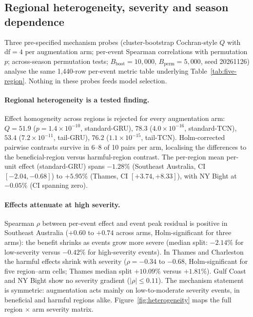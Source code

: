 \subsection{Regional heterogeneity, severity and season dependence}
\label{sec:results-heterogeneity}

Three pre-specified mechanism probes (cluster-bootstrap Cochran-style $Q$
with $\text{df}=4$ per augmentation arm; per-event Spearman correlations
with permutation $p$; across-season permutation tests; $B_{\text{boot}} =
10{,}000$, $B_{\text{perm}} = 5{,}000$, seed 20261126) analyse the same
1{,}440-row per-event metric table underlying
Table~\ref{tab:five-region}. Nothing in these probes feeds model selection.

\paragraph{Regional heterogeneity is a tested finding.} Effect homogeneity
across regions is rejected for every augmentation arm: $Q = 51.9$
($p = 1.4\times10^{-10}$, standard-GRU), $78.3$ ($4.0\times10^{-16}$,
standard-TCN), $53.4$ ($7.2\times10^{-11}$, tail-GRU), $76.2$
($1.1\times10^{-15}$, tail-TCN). Holm-corrected pairwise contrasts survive
in 6--8 of 10 pairs per arm, localising the differences to the
beneficial-region versus harmful-region contrast. The per-region mean
per-unit effect (standard-GRU) spans $-1.28\%$ (Southeast Australia, CI
$[-2.04,-0.68]$) to $+5.95\%$ (Thames, CI $[+3.74,+8.33]$), with NY Bight
at $-0.05\%$ (CI spanning zero).

\paragraph{Effects attenuate at high severity.} Spearman $\rho$ between
per-event effect and event peak residual is positive in Southeast Australia
($+0.60$ to $+0.74$ across arms, Holm-significant for three arms): the
benefit shrinks as events grow more severe (median split: $-2.14\%$ for
low-severity versus $-0.42\%$ for high-severity events). In Thames and
Charleston the harmful effects shrink with severity ($\rho = -0.34$ to
$-0.68$, Holm-significant for five region--arm cells; Thames median split
$+10.09\%$ versus $+1.81\%$). Gulf Coast and NY Bight show no severity
gradient ($|\rho| \le 0.11$). The mechanism statement is symmetric:
augmentation acts mainly on low-to-moderate severity events, in beneficial
and harmful regions alike. Figure~\ref{fig:heterogeneity} maps the full
region $\times$ arm severity matrix.

